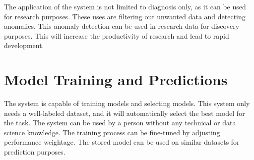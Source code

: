 The application of the system is not limited to diagnosis only, as it can be used for research
purposes. These uses are filtering out unwanted data and detecting anomalies. This anomaly
detection can be used in research data for discovery purposes. This will increase the
productivity of research and lead to rapid development.

\section{Model Training and Predictions} \label{sec:model_training_and_predictions}
The system is capable of training models and selecting models. This system only needs a
well-labeled dataset, and it will automatically select the best model for the task. The system
can be used by a person without any technical or data science knowledge. The training process
can be fine-tuned by adjusting performance weightage. The stored model can be used on similar
datasets for prediction purposes.
